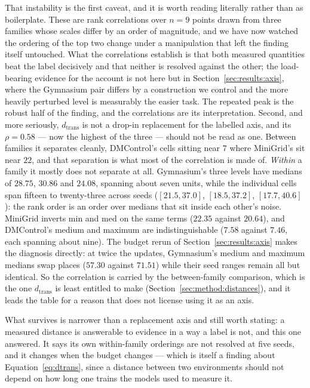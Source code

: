 That instability is the first caveat, and it is worth reading literally rather
than as boilerplate. These are rank correlations over $n = 9$ points drawn from
three families whose scales differ by an order of magnitude, and we have now
watched the ordering of the top two change under a manipulation that left the
finding itself untouched. What the correlations establish is that both measured
quantities beat the label decisively and that neither is resolved against the
other; the load-bearing evidence for the account is not here but in
Section~\ref{sec:results:axis}, where the Gymnasium pair differs by a
construction we control and the more heavily perturbed level is measurably the
easier task. The repeated peak is the robust half of the finding, and the
correlations are its interpretation.
Second, and more seriously, $d_{\mathrm{trans}}$ is not a drop-in replacement
for the labelled axis, and its $\rho = 0.58$ --- now the highest of the three ---
should not be read as one. Between families it separates cleanly, DMControl's
cells sitting near $7$ where MiniGrid's sit near $22$, and that separation is
what most of the correlation is made of. \emph{Within} a family it mostly does
not separate at all. Gymnasium's three levels have medians of $28.75$, $30.86$
and $24.08$, spanning about seven units, while the individual cells span fifteen
to twenty-three across seeds ($[21.5, 37.0]$, $[18.5, 37.2]$, $[17.7, 40.6]$):
the rank order is an order over medians that sit inside each other's noise.
MiniGrid inverts min and med on the same terms ($22.35$ against $20.64$), and
DMControl's medium and maximum are indistinguishable ($7.58$ against $7.46$,
each spanning about nine). The budget rerun of Section~\ref{sec:results:axis}
makes the diagnosis directly: at twice the updates, Gymnasium's medium and
maximum medians swap places ($57.30$ against $71.51$) while their seed ranges
remain all but identical. So the correlation is carried by the between-family
comparison, which is the one $d_{\mathrm{trans}}$ is least entitled to make
(Section~\ref{sec:method:distances}), and it leads the table for a reason that
does not license using it as an axis.

What survives is narrower than a replacement axis and still worth stating: a
measured distance is answerable to evidence in a way a label is not, and this
one answered. It says its own within-family orderings are not resolved at five
seeds, and it changes when the budget changes --- which is itself a finding
about Equation~\ref{eq:dtrans}, since a distance between two environments
should not depend on how long one trains the models used to measure it.

